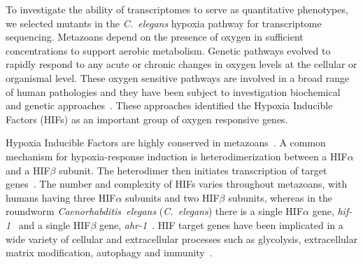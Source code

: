 \documentclass[9pt,twocolumn,twoside]{pnas-new}
\newcommand{\cel}{\emph{C.~elegans}}
\newcommand{\hif}{\emph{hif-1}}
\begin{document}
To investigate the ability of transcriptomes to serve as quantitative phenotypes,
we selected mutants in the \cel{} hypoxia pathway for transcriptome sequencing.
Metazoans depend on the presence of oxygen in sufficient concentrations to
support aerobic metabolism. Genetic pathways evolved to rapidly respond to any
acute or chronic changes in oxygen levels at the cellular or organismal level.
These oxygen sensitive pathways are involved in a broad range of human
pathologies and they have been subject to investigation biochemical and
genetic approaches~\cite{Semenza2012}. These approaches identified the Hypoxia
Inducible Factors (HIFs) as an important group of oxygen responsive genes.

Hypoxia Inducible Factors are highly conserved in metazoans~\cite{Loenarz2011}.
A common mechanism for hypoxia-response induction is heterodimerization between a
HIF$\alpha$ and a HIF$\beta$ subunit. The heterodimer then initiates
transcription of target genes~\cite{Jiang1996}. The number and complexity of HIFs varies
throughout metazoans, with humans having three HIF$\alpha$ subunits and two
HIF$\beta$ subunits, whereas in the roundworm \emph{Caenorhabditis~elegans}
(\cel{}) there is a single HIF$\alpha$ gene, \hif{}~\cite{Jiang2001} and a single HIF$\beta$
gene, \emph{ahr-1}~\cite{Powell-Coffman1998}. HIF target genes have been implicated in a wide variety of
cellular and extracellular processes such as glycolysis, extracellular matrix
modification, autophagy and immunity~\cite{Semenza1994,Bishop2004,Shen2005,
Bellier2009,Semenza2012}.
\end{document}

